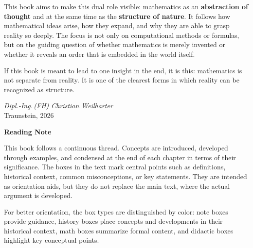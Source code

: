 This book aims to make this dual role visible:
mathematics as an \textbf{abstraction of thought}
and at the same time as the \textbf{structure of nature}.
It follows how mathematical ideas arise,
how they expand,
and why they are able to grasp reality so deeply.
The focus is not only on computational methods or formulas,
but on the guiding question
of whether mathematics is merely invented
or whether it reveals an order
that is embedded in the world itself.

If this book is meant to lead to one insight in the end,
it is this:
mathematics is not separate from reality.
It is one of the clearest forms
in which reality can be recognized as structure.

\vspace{2em}

\begin{flushright}
	\textit{Dipl.-Ing.\,(FH) Christian Weilharter}\\
	\vspace{0.5em}
	Traunstein, 2026
\end{flushright}
\newpage
\noindent
\bigskip
\noindent
\textbf{Reading Note}

This book follows a continuous thread.
Concepts are introduced,
developed through examples,
and condensed at the end of each chapter in terms of their significance.
The boxes in the text mark central points
such as definitions, historical context, common misconceptions, or key statements.
They are intended as orientation aids,
but they do not replace the main text,
where the actual argument is developed.

\medskip
\noindent
For better orientation, the box types are distinguished by color:
note boxes provide guidance,
history boxes place concepts and developments in their historical context,
math boxes summarize formal content,
and didactic boxes highlight key conceptual points.
